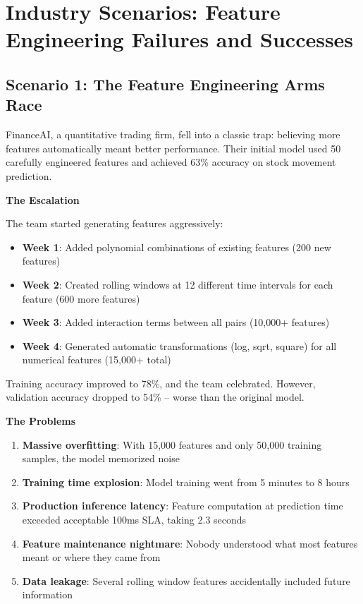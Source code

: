 \section{Industry Scenarios: Feature Engineering Failures and Successes}

\subsection{Scenario 1: The Feature Engineering Arms Race}

FinanceAI, a quantitative trading firm, fell into a classic trap: believing more features automatically meant better performance. Their initial model used 50 carefully engineered features and achieved 63\% accuracy on stock movement prediction.

\textbf{The Escalation}

The team started generating features aggressively:
\begin{itemize}
    \item \textbf{Week 1}: Added polynomial combinations of existing features (200 new features)
    \item \textbf{Week 2}: Created rolling windows at 12 different time intervals for each feature (600 more features)
    \item \textbf{Week 3}: Added interaction terms between all pairs (10,000+ features)
    \item \textbf{Week 4}: Generated automatic transformations (log, sqrt, square) for all numerical features (15,000+ total)
\end{itemize}

Training accuracy improved to 78\%, and the team celebrated. However, validation accuracy dropped to 54\% -- worse than the original model.

\textbf{The Problems}

\begin{enumerate}
    \item \textbf{Massive overfitting}: With 15,000 features and only 50,000 training samples, the model memorized noise
    \item \textbf{Training time explosion}: Model training went from 5 minutes to 8 hours
    \item \textbf{Production inference latency}: Feature computation at prediction time exceeded acceptable 100ms SLA, taking 2.3 seconds
    \item \textbf{Feature maintenance nightmare}: Nobody understood what most features meant or where they came from
    \item \textbf{Data leakage}: Several rolling window features accidentally included future information
\end{enumerate}

